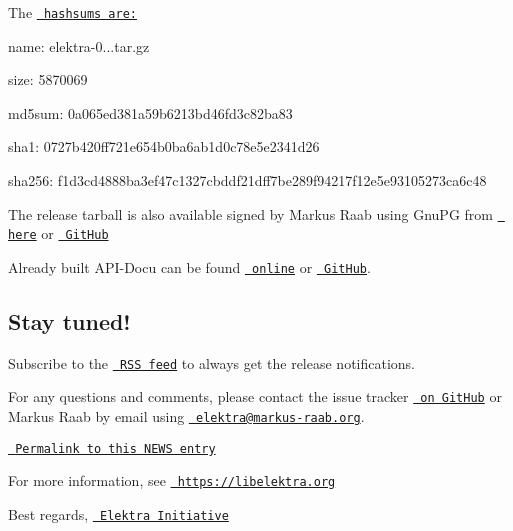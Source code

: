 The \href{https://github.com/ElektraInitiative/ftp/blob/master/releases/elektra-0.8.23.tar.gz.hashsum?raw=true}{\texttt{ hashsums are\+:}}


\begin{DoxyItemize}
\item name\+: elektra-\/0...\+tar.\+gz
\item size\+: 5870069
\item md5sum\+: 0a065ed381a59b6213bd46fd3c82ba83
\item sha1\+: 0727b420ff721e654b0ba6ab1d0c78e5e2341d26
\item sha256\+: f1d3cd4888ba3ef47c1327cbddf21dff7be289f94217f12e5e93105273ca6c48
\end{DoxyItemize}

The release tarball is also available signed by Markus Raab using Gnu\+PG from \href{https://www.libelektra.org/ftp/elektra/releases/elektra-0.8.23.tar.gz.gpg}{\texttt{ here}} or \href{https://github.com/ElektraInitiative/ftp/blob/master/releases//elektra-0.8.23.tar.gz.gpg?raw=true}{\texttt{ Git\+Hub}}

Already built A\+P\+I-\/\+Docu can be found \href{https://doc.libelektra.org/api/0.8.23/html/}{\texttt{ online}} or \href{https://github.com/ElektraInitiative/doc/tree/master/api/0.8.23}{\texttt{ Git\+Hub}}.\hypertarget{doc_news_2018-05-13_0_8_23_md_autotoc_md2212}{}\subsection{Stay tuned!}\label{doc_news_2018-05-13_0_8_23_md_autotoc_md2212}
Subscribe to the \href{https://www.libelektra.org/news/feed.rss}{\texttt{ R\+SS feed}} to always get the release notifications.

For any questions and comments, please contact the issue tracker \href{http://issues.libelektra.org}{\texttt{ on Git\+Hub}} or Markus Raab by email using \href{mailto:elektra@markus-raab.org}{\texttt{ elektra@markus-\/raab.\+org}}.

\href{https://www.libelektra.org/news/0.8.23-release}{\texttt{ Permalink to this N\+E\+WS entry}}

For more information, see \href{https://libelektra.org}{\texttt{ https\+://libelektra.\+org}}

Best regards, \href{https://www.libelektra.org/developers/authors}{\texttt{ Elektra Initiative}} 